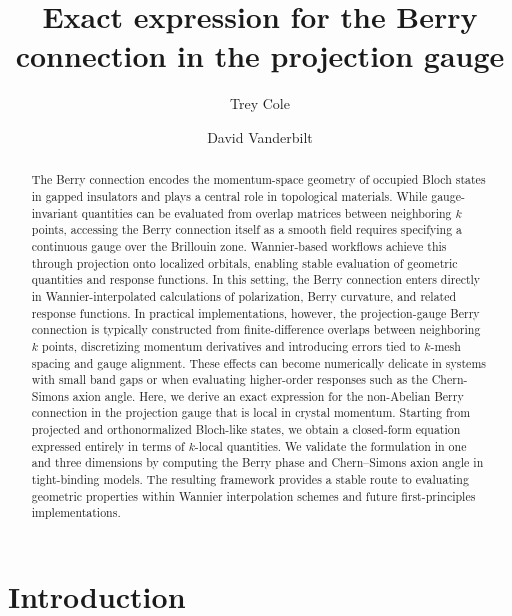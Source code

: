 \documentclass[galley,aps,pra,10pt,amsmath,amssymb,
    superscriptaddress,nofootinbib,longbibliography]{revtex4-2}
\begin{document}
\title{ 
Exact expression for the Berry connection in the projection gauge
}

\author{Trey Cole}

\author{David Vanderbilt}

\begin{abstract}
The Berry connection encodes the momentum-space geometry of occupied Bloch states in gapped insulators and plays a central role in topological materials. While gauge-invariant quantities can be evaluated from overlap matrices between neighboring $k$ points, accessing the Berry connection itself as a smooth field requires specifying a continuous gauge over the Brillouin zone. Wannier-based workflows achieve this through projection onto localized orbitals, enabling stable evaluation of geometric quantities and response functions. In this setting, the Berry connection enters directly in Wannier-interpolated calculations of polarization, Berry curvature, and related response functions. In practical implementations, however, the projection-gauge Berry connection is typically constructed from finite-difference overlaps between neighboring $k$ points, discretizing momentum derivatives and introducing errors tied to $k$-mesh spacing and gauge alignment. These effects can become numerically delicate in systems with small band gaps or when evaluating higher-order responses such as the Chern-Simons axion angle. Here, we derive an exact expression for the non-Abelian Berry connection in the projection gauge that is local in crystal momentum. Starting from projected and orthonormalized Bloch-like states, we obtain a closed-form equation expressed entirely in terms of $k$-local quantities. We validate the formulation in one and three dimensions by computing the Berry phase and Chern–Simons axion angle in tight-binding models. The resulting framework provides a stable route to evaluating geometric properties within Wannier interpolation schemes and future first-principles implementations.
\end{abstract}

\maketitle

\section{Introduction}
\end{document}
